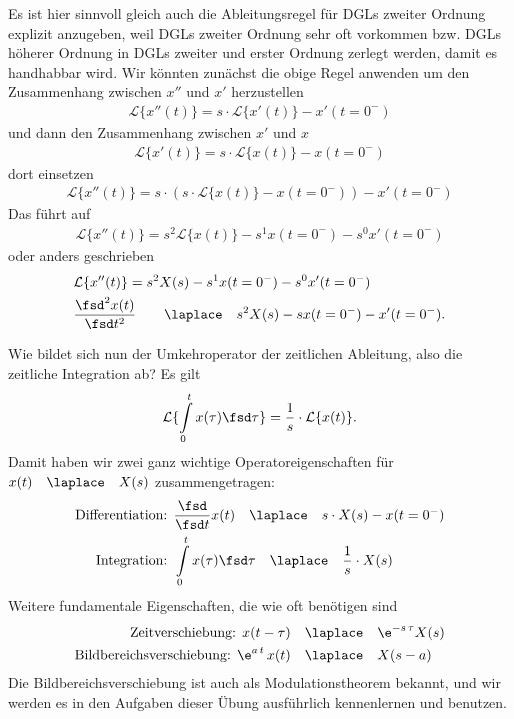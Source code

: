 Es ist hier sinnvoll gleich auch die Ableitungsregel für DGLs zweiter Ordnung
explizit anzugeben, weil DGLs zweiter Ordnung sehr oft vorkommen bzw.
DGLs höherer Ordnung in DGLs zweiter und erster Ordnung zerlegt werden, damit es handhabbar
wird.
%
Wir könnten zunächst die obige Regel  anwenden um den
Zusammenhang  zwischen $x''$ und $x'$ herzustellen
\begin{align}
\mathcal{L}\{x''(t)\}  = s \cdot \mathcal{L}\{x'(t)\} - x'(t=0^-)
\end{align}
und dann den Zusammenhang zwischen $x'$ und $x$
\begin{align}
\mathcal{L}\{x'(t)\}  = s \cdot \mathcal{L}\{x(t)\} - x(t=0^-)
\end{align}
dort einsetzen
\begin{align}
\mathcal{L}\{x''(t)\}  = s \cdot (s \cdot \mathcal{L}\{x(t)\} - x(t=0^-)) - x'(t=0^-)
\end{align}
Das führt auf
\begin{align}
\mathcal{L}\{x''(t)\}  = s^2 \mathcal{L}\{x(t)\} - s^1 x(t=0^-) - s^0 x'(t=0^-)
\end{align}
oder anders geschrieben
\begin{align}
&\mathcal{L}\{x''(t)\} = s^2 X(s) - s^1 x(t=0^-) - s^0 x'(t=0^-)\\
&\frac{\fsd^2 x(t)}{\fsd t^2} \qquad \laplace \quad s^2 X(s) - s x(t=0^-) - x'(t=0^-).
\end{align}

Wie bildet sich nun der Umkehroperator der zeitlichen Ableitung, also die zeitliche
Integration ab? Es gilt
\begin{align}
\mathcal{L}\{\int\limits_{0}^{t} x(\tau)\fsd \tau\}  = \frac{1}{s} \cdot \mathcal{L}\{x(t)\}.
\end{align}
Damit haben wir zwei ganz wichtige Operatoreigenschaften für
$x(t)\quad\laplace\quad X(s)$ zusammengetragen:
\begin{align}
\text{Differentiation:   } &\frac{\fsd }{\fsd t}  x(t) \quad\laplace\quad s\cdot X(s) - x(t=0^-)\\
\text{Integration:   } &\int\limits_{0}^{t} x(\tau) \fsd\tau\quad\laplace\quad \frac{1}{s} \cdot X(s)
\end{align}
%
Weitere fundamentale Eigenschaften, die wie oft benötigen sind
\begin{align}
\text{Zeitverschiebung:   } x(t-\tau)& \quad\laplace\quad \e^{-s\,\tau} X(s)\\
\text{Bildbereichsverschiebung:   } \e^{a\,t} \, x(t)& \quad\laplace\quad X(s-a)
\end{align}
Die Bildbereichsverschiebung ist auch als Modulationstheorem bekannt,
und wir werden es in den Aufgaben dieser Übung ausführlich kennenlernen und
benutzen.


